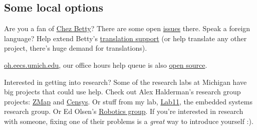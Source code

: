 \documentclass{article}
\begin{document}
\subsection*{Some local options}

Are you a fan of \href{https://chezbetty.eecs.umich.edu}{Chez Betty}? There
are some open \href{https://github.com/um-cseg/chez-betty/issues}{issues} there.
Speak a foreign language? Help extend Betty's
\href{https://github.com/um-cseg/chez-betty/blob/master/README.translation.md}{translation
support} (or help translate any other project, there's huge demand for
translations).

\href{https://oh.eecs.umich.edu}{oh.eecs.umich.edu}, our office hours help queue is also
\href{https://github.com/mterwill/office-hours-help-queue/issues}{open source}.

Interested in getting into research? Some of the research labs at Michigan
have big projects that could use help. Check out Alex Halderman's research group
projects: \href{https://github.com/zmap}{ZMap} and
\href{https://github.com/Censys}{Censys}. Or stuff from my lab,
\href{https://github.com/lab11}{Lab11}, the embedded systems research group.
Or Ed Olsen's \href{https://april.eecs.umich.edu/software/}{Robotics group}.
If you're interested in research with someone, fixing one of their problems is
a \emph{great} way to introduce yourself :).
\end{document}
